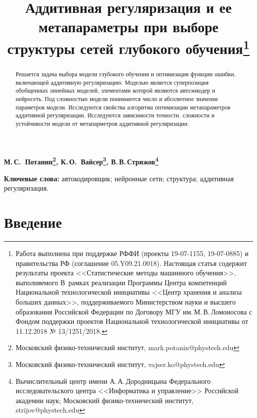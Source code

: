 \documentclass[12pt, twoside]{article}
\begin{document}
\title{\textbf{Аддитивная регуляризация и ее метапараметры при выборе структуры сетей глубокого обучения}\thanks{Работа выполнена при поддержке РФФИ (проекты 19-07-1155, 19-07-0885) и правительства РФ (соглашение 05.Y09.21.0018). Настоящая статья содержит результаты проекта <<Статистические методы машинного обучения>>, выполняемого В~рамках реализации Программы Центра компетенций Национальной технологической инициативы <<Центр хранения и анализа больших данных>>, поддерживаемого Министерством науки и высшего образования Российской Федерации по Договору МГУ им.\,М.\,В.\,Ломоносова  с Фондом поддержки проектов Национальной технологической инициативы от 11.12.2018 № 13/1251/2018.}}
\date{}
\maketitle

\begin{center}
\bf
М.\,С.~Потанин\footnote{Московский физико-технический институт, mark.potanin@phystech.edu}, К.\,О.~Вайсер\footnote{Московский физико-технический институт, vajser.ko@phystech.edu},  В.\,В.\,Стрижов\footnote{Вычислительный центр имени А.\,А.\,Дородницына Федерального исследовательского центра <<Информатика и управление>> Российской академии наук; Московский физико-технический институт, strijov@phystech.edu}
\end{center}

\begin{abstract}	
Решается задача выбора модели глубокого обучения и оптимизация функции ошибки, включающей аддитивную регуляризацию. Моделью является суперпозиция обобщенных линейных моделей, элементами которой являются автоэнкодер и нейросеть. Под сложностью модели понимаются число и абсолютное значение параметров модели. Исследуются свойства алгоритма оптимизации метапараметров аддитивной регуляризации.  Исследуются зависимости точности, сложности и устойчивости модели от метапарметров аддитивной регуляризации.
\end{abstract}

{\bf Ключевые слова:} автокодировщик; нейронные сети; структура; аддитивная регуляризация.

\setcounter{secnumdepth}{0}
\section{Введение}
\end{document}
